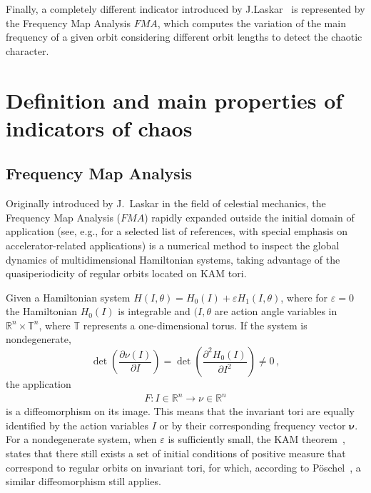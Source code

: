 Finally, a completely different indicator introduced by J.Laskar~\cite{Laskar1999,Laskar2003} is represented by the Frequency Map Analysis $FMA$, which computes the variation of the main frequency of a given orbit considering different orbit lengths to detect the chaotic character. 
%
\section{Definition and main properties of indicators of chaos} \label{sec:dyn:review}
%
\subsection{Frequency Map Analysis\label{subsec:dyn:fma}}
%
Originally introduced by J.~Laskar in the field of celestial mechanics, the Frequency Map Analysis ($FMA$) rapidly expanded outside the initial domain of application (see, e.g., \cite{laskar1995frequency,lega1996numerical,papaphilippou1996frequency,papaphilippou1998global,Laskar1999, Papaphilippou1999, laskar2000application,PhysRevSTAB.4.124201,1288929,Papaphilippou:PAC03-RPPG007,Laskar2003,PhysRevSTAB.6.114801,shun2009non-linear,PhysRevSTAB.14.014001,papaphilippou2014,tydecks:ipac18-mopmf057,PhysRevAccelBeams.22.071002} for a selected list of references, with special emphasis on accelerator-related applications) is a numerical method to inspect the global dynamics of multidimensional Hamiltonian systems, taking advantage of the quasiperiodicity of regular orbits located on KAM tori.

Given a Hamiltonian system $H(I,\theta) = H_0 (I) + \varepsilon H_1 (I, \theta)$, where for $\varepsilon=0$ the Hamiltonian $H_0(I)$ is integrable and $(I, \theta$ are action angle variables in $\mathbb{R}^n \times \mathbb{T}^n$, where $\mathbb{T}$ represents a one-dimensional torus. %
If the system is nondegenerate,
\begin{equation}
    \operatorname{det}\left(\frac{\partial \nu(I)}{\partial I}\right)=\operatorname{det}\left(\frac{\partial^2 H_0(I)}{\partial I^2}\right) \neq 0 \,,
\end{equation}
the application
\begin{equation}
    \begin{array}{r}
    F: I\in \mathbb{R}^{n} \longrightarrow \nu\in \mathbb{R}^n 
    \end{array}
\end{equation}
is a diffeomorphism on its image. This means that the invariant tori are equally identified by the action variables $I$ or by their corresponding frequency vector $\mathbf{\nu}$. For a nondegenerate system, when $\varepsilon$ is sufficiently small, the KAM theorem~\cite{KAM1,KAM2,KAM3}, states that there still exists a set of initial conditions of positive measure that correspond to regular orbits on invariant tori, for which, according to Pöschel~\cite{Poschel1982}, a similar diffeomorphism still applies.

